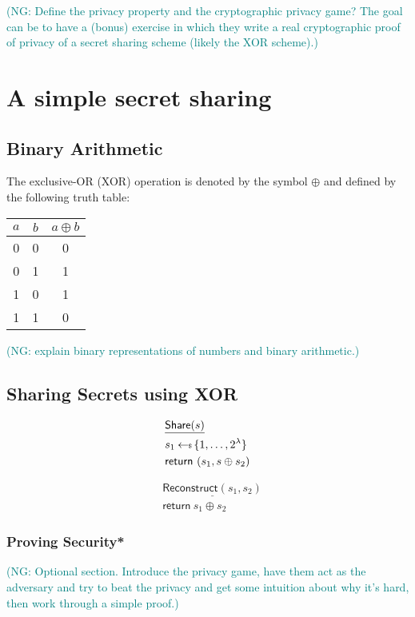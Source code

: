 \documentclass[12 pt]{article}
\newcommand{\sample}{\hskip2.3pt{\gets\!\!\mbox{\tiny${\$}$\normalsize}}\,}
\newcommand{\nsm}[1]{\textcolor{teal}{(NG: #1)}}
\newcounter{exercise}[section]
\begin{document}
\nsm{Define the privacy property and the cryptographic privacy game? The goal can be to have a (bonus) exercise in which they write a real cryptographic proof of privacy of a secret sharing scheme (likely the XOR scheme).}

\newpage
\section{A simple secret sharing}

\subsection{Binary Arithmetic}

The exclusive-OR (XOR) operation is denoted by the symbol $\oplus$ and defined by the following truth table:

\begin{center}
\begin{tabular}{c|c|c}
    $a$ & $b$ & $a \oplus b$\\\hline
    0 & 0 & 0\\
    0 & 1 & 1\\
    1 & 0 & 1\\
    1 & 1 & 0
\end{tabular}
\end{center}

\nsm{explain binary representations of numbers and binary arithmetic.}

\subsection{Sharing Secrets using XOR}

\begin{align*}
    & \underline{\textsf{Share}(s)} \\
    & s_1 \sample \{1, \ldots, 2^\lambda\} \\
    & \textsf{return}~ (s_1, s \oplus s_2)
\end{align*}

\begin{align*}
    & \underline{\textsf{Reconstruct}(s_1, s_2)} \\
    & \textsf{return}~ s_1 \oplus s_2
\end{align*}

\subsubsection{Proving Security*}
\nsm{Optional section. Introduce the privacy game, have them act as the adversary and try to beat the privacy and get some intuition about why it's hard, then work through a simple proof.}
\end{document}
